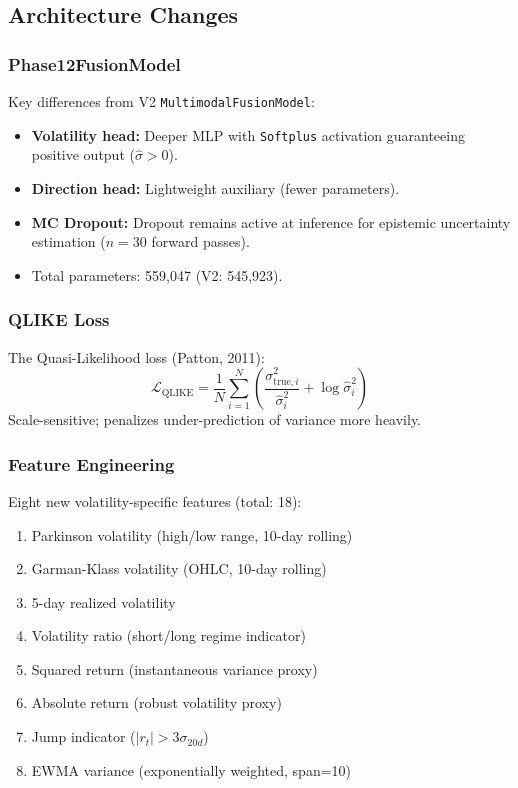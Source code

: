 \documentclass[12pt,a4paper]{article}
\begin{document}
\subsection{Architecture Changes}

\subsubsection{Phase12FusionModel}
Key differences from V2 \texttt{MultimodalFusionModel}:
\begin{itemize}
    \item \textbf{Volatility head:} Deeper MLP with \texttt{Softplus} activation
          guaranteeing positive output ($\hat{\sigma} > 0$).
    \item \textbf{Direction head:} Lightweight auxiliary (fewer parameters).
    \item \textbf{MC Dropout:} Dropout remains active at inference for
          epistemic uncertainty estimation ($n=30$ forward passes).
    \item Total parameters: 559,047 (V2: 545,923).
\end{itemize}

\subsubsection{QLIKE Loss}
The Quasi-Likelihood loss (Patton, 2011):
\[
    \mathcal{L}_{\text{QLIKE}} = \frac{1}{N}\sum_{i=1}^N
    \left(\frac{\sigma^2_{\text{true},i}}{\hat{\sigma}^2_i}
    + \log\hat{\sigma}^2_i\right)
\]
Scale-sensitive; penalizes under-prediction of variance more heavily.

\subsubsection{Feature Engineering}
Eight new volatility-specific features (total: 18):
\begin{enumerate}
    \item Parkinson volatility (high/low range, 10-day rolling)
    \item Garman-Klass volatility (OHLC, 10-day rolling)
    \item 5-day realized volatility
    \item Volatility ratio (short/long regime indicator)
    \item Squared return (instantaneous variance proxy)
    \item Absolute return (robust volatility proxy)
    \item Jump indicator ($|r_t| > 3\sigma_{20d}$)
    \item EWMA variance (exponentially weighted, span=10)
\end{enumerate}
\end{document}
